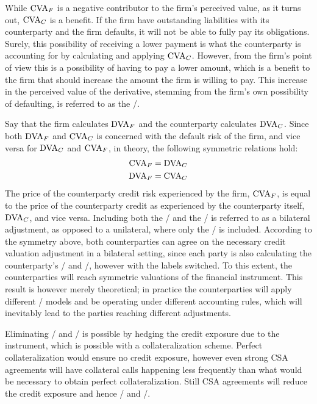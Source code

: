 \documentclass[main.tex]{subfiles}
\begin{document}
        While $\CVA/_{F}$ is a negative contributor to the firm's perceived value, 
        as it turns out, $\CVA/_{C}$ is a benefit.
        If the firm have outstanding liabilities with its counterparty
        and the firm defaults, it will not be able to fully pay its obligations. 
        Surely, this possibility of receiving a lower payment is what the counterparty is accounting for 
        by calculating and applying $\CVA/_{C}$.
        However, from the firm's point of view this is a possibility of having to pay a lower amount,
        which is a benefit to the firm that should increase the amount the firm is willing to pay.
        This increase in the perceived value of the derivative, 
        stemming from the firm's own possibility of defaulting, 
        is referred to as the \DVA/.

        Say that the firm calculates $\DVA/_{F}$ and the counterparty calculates $\DVA/_{C}$.
        Since both $\DVA/_{F}$ and $\CVA/_{C}$ is concerned with the default risk of the firm,
        and vice versa for $\DVA/_{C}$ and $\CVA/_{F}$, in theory, the following symmetric relations hold:
            \begin{align*}
                \CVA/_{F} &= \DVA/_{C} \\
                \DVA/_{F} &= \CVA/_{C}
            \end{align*}
        The price of the counterparty credit risk experienced by the firm, $\CVA/_{F}$,
        is equal to the price of the counterparty credit as experienced by the counterparty itself, $\DVA/_{C}$,
        and vice versa.
        Including both the \CVA/ and the \DVA/ is referred to as a bilateral adjustment,
        as opposed to a unilateral, where only the \CVA/ is included.
        According to the symmetry above,
        both counterparties can agree on the necessary credit valuation adjustment in a bilateral setting,
        since each party is also calculating the counterparty's \CVA/ and \DVA/, however with the labels switched.
        To this extent, the counterparties will reach symmetric valuations of the financial instrument. 
        This result is however merely theoretical; 
        in practice the counterparties will apply different \CVA/ models
        and be operating under different accounting rules, 
        which will inevitably lead to the parties reaching different adjustments. 
        
        Eliminating \CVA/ and \DVA/ is possible by hedging the credit exposure due to the instrument,
        which is possible with a collateralization scheme. 
        Perfect collateralization would ensure no credit exposure,
        however even strong CSA agreements will have collateral calls happening less frequently
        than what would be necessary to obtain perfect collateralization.
        Still CSA agreements will reduce the credit exposure and hence \CVA/ and \DVA/.
\end{document}
